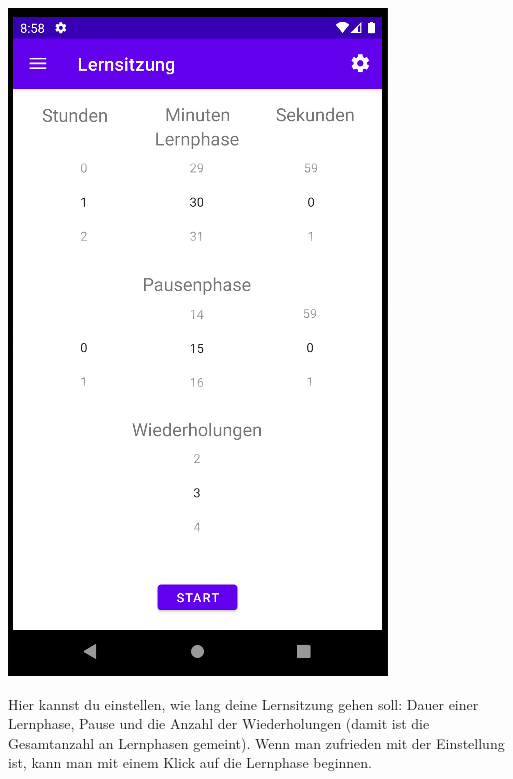 \documentclass[ngerman]{tutorial}
\begin{document}
\begin{center}
    \includegraphics[scale=0.6]{learn_start.png}
\end{center}
Hier kannst du einstellen, wie lang deine Lernsitzung gehen soll: Dauer einer Lernphase, Pause und die Anzahl der Wiederholungen (damit ist die Gesamtanzahl an Lernphasen gemeint). Wenn man zufrieden mit der Einstellung ist, kann man mit einem Klick auf  die Lernphase beginnen.
\end{document}
